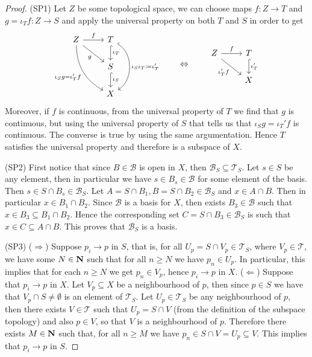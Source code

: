 \begin{proof}
(SP1) Let \(Z\) be some topological space, we can choose maps \(f: Z \to T\)
and \(g = \iota_T  f : Z \to S\) and apply the universal property on both
\(T\) and \(S\) in order to get
\[
  \begin{tikzcd}
    Z \ar[r,"f"]
    \ar[rd, swap, "g"]
    \ar[rdd, swap, bend right,
    "\iota_S  g = \iota_T'  f"]
      &T \ar[d, hook, "\iota_T"]
      \ar[dd, hook, bend left = 60, "\iota_S  \iota_T \coloneq \iota_T'"]\\
      &S \ar[d, hook, "\iota_S"] \\
      &X
  \end{tikzcd}
  \qquad \Leftrightarrow \qquad
  \begin{tikzcd}
    Z \ar[dr, swap, "\iota_T'  f"] \ar[r, "f"]
      &T \ar[d, hook, "\iota_T'"] \\
      &X
  \end{tikzcd}
\]
Moreover, if \(f\) is continuous, from the universal property of \(T\) we find
that \(g\) is continuous, but using the universal property of \(S\) that tells
us that \(\iota_S  g = \iota_T' f\) is continuous. The converse is
true by using the same argumentation. Hence \(T\) satisfies the universal
property and therefore is a subspace of \(X\).

(SP2) First notice that since \(B \in \mathcal B\) is open in \(X\), then
\(\mathcal B_S \subseteq \mathcal T_S\). Let \(s \in S\) be any element, then in
particular we have \(s \in B_s \in \mathcal B\) for some element of the
basis. Then \(s \in S \cap B_s \in \mathcal B_S\). Let
\(A = S \cap B_1, B = S \cap B_2 \in \mathcal B_S\) and \(x \in A \cap B\). Then
in particular \(x \in B_1 \cap B_2\). Since \(\mathcal B\) is a basis for \(X\),
then exists \(B_3 \in \mathcal B\) such that
\(x \in B_3 \subseteq B_1 \cap B_2\). Hence the corresponding set
\(C = S \cap B_3 \in \mathcal B_S\) is such that \(x \in C \subseteq A \cap
B\). This proves that \(\mathcal B_S\) is a basis.

(SP3) (\(\Rightarrow\)) Suppose \(p_i \to p\) in \(S\), that is, for all
\(U_p = S \cap V_p \in \mathcal T_S\), where \(V_p \in \mathcal T\), we have
some \(N \in \mathbf{N}\) such that for all \(n \geq N\) we have \(p_n \in U_p\). In
particular, this implies that for each \(n \geq N\) we get \(p_n \in V_p\),
hence \(p_i \to p\) in \(X\).  (\(\Leftarrow\)) Suppose that \(p_i \to p\) in
\(X\). Let \(V_p \subseteq X\) be a neighbourhood of \(p\), then since
\(p \in S\) we have that \(V_p \cap S \neq \emptyset\) is an element of
\(\mathcal T_S\). Let \(U_p \in \mathcal T_S\) be any neighbourhood of \(p\),
then there exists \(V \in \mathcal T\) such that \(U_p = S \cap V\) (from the
definition of the subspace topology) and also \(p \in V\), so that \(V\) is a
neighbourhood of \(p\).  Therefore there exists \(M \in \mathbf{N}\) such that, for all
\(n \geq M\) we have \(p_n \in S \cap V = U_p \subseteq V\). This implies that
\(p_i \to p\) in \(S\).


\end{proof}
